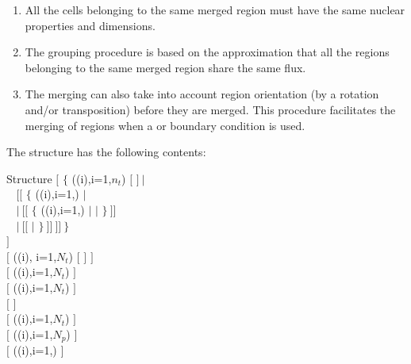 \begin{enumerate}

\item All the cells belonging to the same merged region must have the same
nuclear properties and dimensions. 

\item The grouping procedure is based on the approximation that all the regions
belonging to the same merged region share the same flux. 

\item The merging can also take into account region orientation  (by a rotation
and/or transposition) before they are merged. This procedure facilitates the
merging of regions when a  or  boundary condition is used. 

\end{enumerate}
The  structure has the following contents: 

\begin{DataStructure}{Structure }
$[$  $\{$  ((i),i=1,$n_t$) $[$  $]~|$\\
$~~~~[[$   $\{$ ((i),i=1,) $|$  \\
$~~~~|~[[$  $\{$ ((i),i=1,) $|$   $|$   $\}~]]$\\
$~~~~|~[[$     $|$   $\}~]]~]]~\}$\\
$]$\\
$[$   ((i), i=1,$N_t$) $[$  $]$ $]$\\
$[$   ((i),i=1,$N_t$) $]$\\
$[$  ((i),i=1,$N_t$) $]$\\
$[$   $]$\\
$[$   ((i),i=1,$N_t$) $]$\\
$[$  ((i),i=1,$N_p$) $]$\\
$[$  ((i),i=1,) $]$
\end{DataStructure}

\noindent

